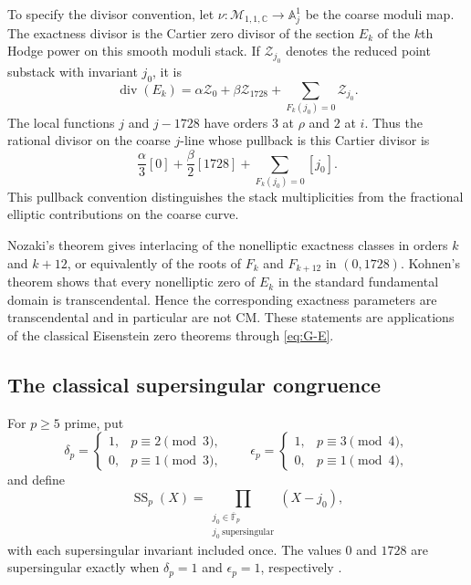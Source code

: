 \documentclass[11pt]{amsart}
\theoremstyle{definition}
\theoremstyle{remark}
\numberwithin{equation}{section}
\begin{document}
To specify the divisor convention, let $\nu:\mathcal M_{1,1,\mathbb C}
\to\mathbb A^1_j$ be the coarse moduli map. The exactness divisor is
the Cartier zero divisor of the section $E_k$ of the $k$th Hodge
power on this smooth moduli stack. If $\mathcal Z_{j_0}$ denotes the
reduced point substack with invariant $j_0$, it is
\[
\operatorname{div}(E_k)
=\alpha\mathcal Z_0+\beta\mathcal Z_{1728}
 +\sum_{F_k(j_0)=0}\mathcal Z_{j_0}.
\]
The local functions $j$ and $j-1728$ have orders $3$ at $\rho$ and
$2$ at $i$. Thus the rational divisor on the coarse $j$-line whose
pullback is this Cartier divisor is
\begin{equation}\label{eq:coarse-exactness-divisor}
\frac{\alpha}{3}[0]+\frac{\beta}{2}[1728]
 +\sum_{F_k(j_0)=0}[j_0].
\end{equation}
This pullback convention distinguishes the stack multiplicities from
the fractional elliptic contributions on the coarse curve.

Nozaki's theorem \cite{nozaki} gives interlacing of the nonelliptic
exactness classes in orders $k$ and $k+12$, or equivalently of the
roots of $F_k$ and $F_{k+12}$ in $(0,1728)$. Kohnen's theorem
\cite{kohnen-trans} shows that every nonelliptic zero of $E_k$ in the
standard fundamental domain is transcendental. Hence the corresponding
exactness parameters are transcendental and in particular are not CM.
These statements are applications of the classical Eisenstein zero
theorems through \eqref{eq:G-E}.

\subsection{The classical supersingular congruence}

For $p\geq5$ prime, put
\[
\delta_p=\begin{cases}1,&p\equiv2\pmod3,\\0,&p\equiv1\pmod3,\end{cases}
\qquad
\epsilon_p=\begin{cases}1,&p\equiv3\pmod4,\\0,&p\equiv1\pmod4,\end{cases}
\]
and define
\[
\operatorname{SS}_p(X)=
\prod_{\substack{j_0\in\overline{\mathbb F}_p\\
                 j_0\ \mathrm{supersingular}}}(X-j_0),
\]
with each supersingular invariant included once. The values $0$ and
$1728$ are supersingular exactly when $\delta_p=1$ and $\epsilon_p=1$,
respectively \cite[\S2]{kz-ss}.
\end{document}
